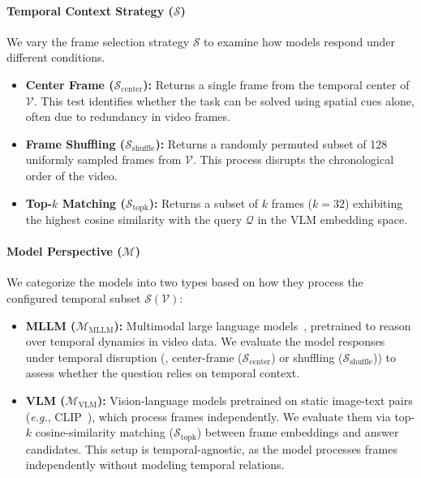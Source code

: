         \paragraph{\textbf{Temporal Context Strategy ($\mathcal{S}$)}}
        We vary the frame selection strategy $\mathcal{S}$ to examine how models respond under different conditions.
        \begin{itemize}
            \item \textbf{Center Frame ($\mathcal{S}_{\text{center}}$):} Returns a single frame from the temporal center of $\mathcal{V}$. 
            This test identifies whether the task can be solved using spatial cues alone, often due to redundancy in video frames.
            
            \item \textbf{Frame Shuffling ($\mathcal{S}_{\text{shuffle}}$):} Returns a randomly permuted subset of 128 uniformly sampled frames from $\mathcal{V}$. 
            This process disrupts the chronological order of the video.
            
            \item \textbf{Top-$k$ Matching ($\mathcal{S}_{\text{topk}}$):} Returns a subset of $k$ frames ($k=32$) exhibiting the highest cosine similarity with the query $\mathcal{Q}$ in the VLM embedding space.
        \end{itemize}
    
        \paragraph{\textbf{Model Perspective ($\mathcal{M}$)}}
        We categorize the models into two types based on how they process the configured temporal subset $\mathcal{S}(\mathcal{V})$:
        
        \begin{itemize}
            \item \textbf{MLLM ($\mathcal{M}_{\text{MLLM}}$):} Multimodal large language models~\cite{eagle25,qwem3_vl,videoautor1}, pretrained to reason over temporal dynamics in video data. 
            We evaluate the model responses under temporal disruption (\eg, center-frame ($\mathcal{S}_{\text{center}}$) or shuffling ($\mathcal{S}_{\text{shuffle}}$)) to assess whether the question relies on temporal context.
        
            \item \textbf{VLM ($\mathcal{M}_{\text{VLM}}$):} Vision-language models pretrained on static image-text pairs (\textit{e.g.}, CLIP~\cite{clip,evaclip,longclip}), which process frames independently. 
            We evaluate them via top-$k$ cosine-similarity matching ($\mathcal{S}_{\text{topk}}$) between frame embeddings and answer candidates. This setup is temporal-agnostic, as the model processes frames independently without modeling temporal relations.
        \end{itemize}
    

